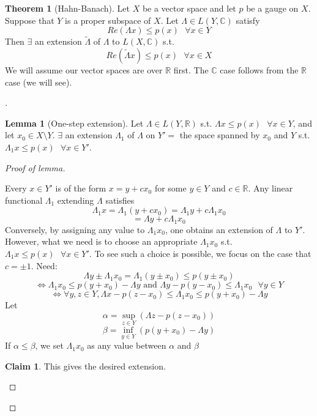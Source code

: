 \documentclass{article}
\theoremstyle{definition}
\newtheorem{thm}{Theorem}
\newtheorem{lem}{Lemma}
\newtheorem*{clm}{Claim}
\newenvironment{proofs}[1][\proofname]{%
  \begin{proof}[#1]$ $\par\nobreak\ignorespaces
}{%
  \end{proof}
}
\newcommand{\sfa}{\text{  } \forall}
\begin{document}
\begin{thm}[Hahn-Banach]
	Let $X$ be a vector space and let $p$ be a gauge on $X$. 
	Suppose that $Y$ is a proper subspace of $X$.
	Let $\Lambda \in L(Y, \mathbb{C})$ satisfy
	\[
		Re(\Lambda x) \leq p(x) \sfa x \in Y
	\]
	Then $\exists$ an extension $\tilde{\Lambda}$ of $\Lambda$ to $L(X, \mathbb{C})$ s.t.
	\[
		Re(\tilde{\Lambda} x) \leq p(x) \sfa x \in X
	\]
	We will assume our vector spaces are over $\mathbb{R}$ first.
	The $\mathbb{C}$ case follows from the $\mathbb{R}$ case (we will see).
\end{thm}

\begin{proofs}
	\begin{lem}[One-step extension]
		Let $\Lambda \in L(Y, \mathbb{R})$ s.t. $\Lambda x \leq p(x) \sfa x \in Y$, and let $x_0 \in X \setminus Y$. $\exists$ an extension $\Lambda_1$ of $\Lambda$ on $Y' =$ the space spanned by $x_0$ and $Y$ s.t. $\Lambda_1 x \leq p(x) \sfa x \in Y'$.
	\end{lem}

	\begin{proofs}[Proof of lemma]
		Every $x \in Y'$ is of the form $x = y + c x_0$ for some $y \in Y$ and $c \in \mathbb{R}$. Any linear functional $\Lambda_1$ extending $\Lambda$ satisfies
		\[
			\Lambda_1 x = \Lambda_1 (y + c x_0) = \Lambda_1 y + c \Lambda_1 x_0
		\]
		\[
			= \Lambda y + c \Lambda_1 x_0
		\]
		Conversely, by assigning any value to $\Lambda_1 x_0$, one obtains an extension of $\Lambda$ to $Y'$. However, what we need is to choose an appropriate $\Lambda_1 x_0$ s.t. $\Lambda_1 x \leq p(x) \sfa x \in Y'$. To see such a choice is possible, we focus on the case that $c = \pm 1$.
		Need:
		\[
			\Lambda y \pm \Lambda_1 x_0 = \Lambda_1(y \pm x_0) \leq p(y \pm x_0) 
		\]
		\[
			\Leftrightarrow \Lambda_1 x_0 \leq p(y + x_0) - \Lambda y \text{ and } \Lambda y - p(y - x_0) \leq \Lambda_1 x_0 \sfa y \in Y
		\]
		\[
			\Leftrightarrow \forall y, z \in Y, \Lambda x - p(z - x_0) \leq \Lambda_1 x_0 \leq p(y + x_0) - \Lambda y
		\]
		Let 
		\[
			\alpha = \sup_{z \in Y} (\Lambda z - p(z - x_0))
		\]
		\[
			\beta = \inf_{y \in Y} (p(y + x_0) - \Lambda y)
		\]
		If $\alpha \leq \beta$, we set $\Lambda_1 x_0$ as any value between $\alpha$ and $\beta$
		\begin{clm}
			This gives the desired extension.
		\end{clm}


\end{proofs}
\end{proofs}
\end{document}
